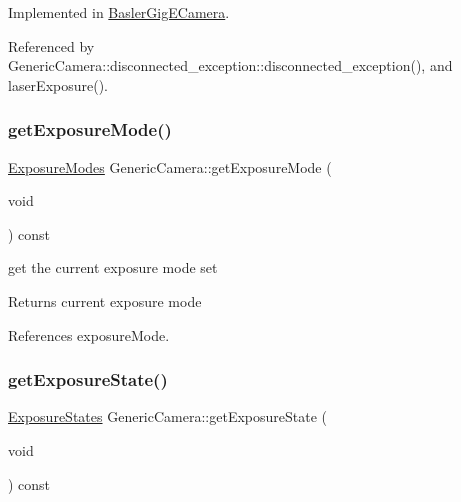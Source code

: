 Implemented in \hyperlink{classBaslerGigECamera_a5f7897cae5155958ecaa8b2b9196e4e6}{Basler\+Gig\+E\+Camera}.



Referenced by Generic\+Camera\+::disconnected\+\_\+exception\+::disconnected\+\_\+exception(), and laser\+Exposure().

\mbox{\label{classGenericCamera_afdd27d857471c1bca22f10520ef28a35}} 
\subsubsection{\texorpdfstring{get\+Exposure\+Mode()}{getExposureMode()}}
{\footnotesize\ttfamily \hyperlink{constants_8h_a6e920987695b1da6e2df4e41dc867e18}{Exposure\+Modes} Generic\+Camera\+::get\+Exposure\+Mode (\begin{DoxyParamCaption}\item[{void}]{ }\end{DoxyParamCaption}) const\hspace{0.3cm}{\ttfamily [inline]}}

get the current exposure mode set \begin{DoxyReturn}{Returns}
current exposure mode 
\end{DoxyReturn}


References exposure\+Mode.

\mbox{\label{classGenericCamera_a31369d7e310827a9ac3b4366ddcbf22e}} 
\subsubsection{\texorpdfstring{get\+Exposure\+State()}{getExposureState()}}
{\footnotesize\ttfamily \hyperlink{constants_8h_ae9749bac8d6973b92725af092d0a76bc}{Exposure\+States} Generic\+Camera\+::get\+Exposure\+State (\begin{DoxyParamCaption}\item[{void}]{ }\end{DoxyParamCaption}) const\hspace{0.3cm}{\ttfamily [inline]}}

